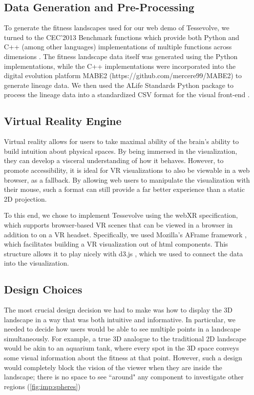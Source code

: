 \subsection{Data Generation and Pre-Processing}

To generate the fitness landscapes used for our web demo of Tessevolve, we turned to the CEC'2013 Benchmark functions which provide both Python and C++ (among other languages) implementations of multiple functions across dimensions \citep{li_benchmark_2013}. The fitness landscape data itself was generated using the Python implementations, while the C++ implementations were incorporated into the digital evolution platform MABE2 (https://github.com/mercere99/MABE2) to generate lineage data. We then used the ALife Standards Python package to process the lineage data into a standardized CSV format for the visual front-end \citep{lalejini_data_2019}.


\subsection{Virtual Reality Engine}

Virtual reality allows for users to take maximal ability of the brain's ability to build intuition about physical spaces. By being immersed in the visualization, they can develop a visceral understanding of how it behaves. However, to promote accessibility, it is ideal for VR visualizations to also be viewable in a web browser, as a fallback. By allowing web users to manipulate the visualization with their mouse, such a format can still provide a far better experience than a static 2D projection.

To this end, we chose to implement Tessevolve using the webXR specification, which supports browser-based VR scenes that can be viewed in a browser in addition to on a VR headset. Specifically, we used Mozilla's AFrame framework \citep{mozilla_-frame_2022}, which facilitates building a VR visualization out of html components. This structure allows it to play nicely with d3.js \citep{bostock_d_2011}, which we used to connect the data into the visualization.

\subsection{Design Choices}

The most crucial design decision we had to make was how to display the 3D landscape in a way that was both intuitive and informative. In particular, we needed to decide how users would be able to see multiple points in a landscape simultaneously. For example, a true 3D analogue to the traditional 2D landscape would be akin to an aquarium tank, where every spot in the 3D space conveys some visual information about the fitness at that point. However, such a design would completely block the vision of the viewer when they are inside the landscape; there is no space to see ``around" any component to investigate other regions (\autoref{fig:imp:spheres}) 

